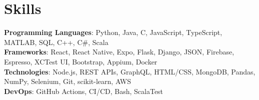 \section{Skills}
    \begin{itemize}[leftmargin=0.15in, label={}]
	\small{\item{
		\textbf{Programming Languages}{: Python, Java, C, JavaScript, TypeScript, MATLAB, SQL, C++, C\#, Scala} \\
		\textbf{Frameworks}{: React, React Native, Expo, Flask, Django, JSON, Firebase, Espresso, XCTest UI, Bootstrap, Appium, Docker} \\
		\textbf{Technologies}{: Node.js, REST APIs, GraphQL,  HTML/CSS, MongoDB, Pandas, NumPy, Selenium, Git, scikit-learn, AWS} \\
		\textbf{DevOps}{: GitHub Actions, CI/CD, Bash, ScalaTest} \\
	}}
    \end{itemize}
